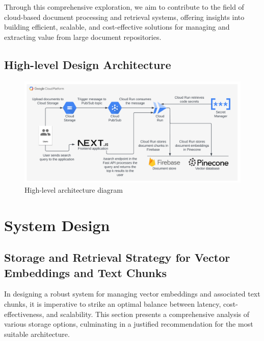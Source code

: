 \documentclass[a4paper, 12pt]{report}
\begin{document}
Through this comprehensive exploration, we aim to contribute to the field of cloud-based document processing and retrieval systems, offering insights into building efficient, scalable, and cost-effective solutions for managing and extracting value from large document repositories.

\clearpage
\section{High-level Design Architecture}

\begin{figure}[htbp]
    \centering
    \includegraphics[width=\textwidth]{high-level-architecture.png}
    \caption{High-level architecture diagram}
    \label{fig:high-level-architecture}
\end{figure}



\chapter{System Design}

\section{Storage and Retrieval Strategy for Vector Embeddings and Text Chunks}
In designing a robust system for managing vector embeddings and associated text chunks, it is imperative to strike an optimal balance between latency, cost-effectiveness, and scalability. This section presents a comprehensive analysis of various storage options, culminating in a justified recommendation for the most suitable architecture.
\end{document}
